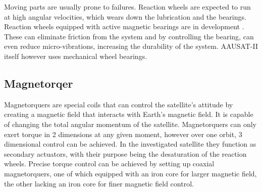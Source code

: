 Moving parts are usually prone to failures. Reaction wheels are expected to run at high angular velocities, which wears down the lubrication and the bearings. Reaction wheels equipped with active magnetic bearings are in development \cite{MagneticReactWheel}. These can eliminate friction from the system and by controlling the bearing, can even reduce micro-vibrations, increasing the durability of the system. AAUSAT-II itself however uses mechanical wheel bearings.



\subsection{Magnetorqer}

Magnetorquers are special coils that can control the satellite's attitude by creating a magnetic field that interacts with Earth's magnetic field. It is capable of changing the total angular momentum of the satellite. Magnetorquers can only exert torque in 2 dimensions at any given moment, however over one orbit, 3 dimensional control can be achieved. In the investigated satellite they function as secondary actuators, with their purpose being the desaturation of the reaction wheels. Precise torque control can be achieved by setting up coaxial magnetorquers, one of which equipped with an iron core for larger magnetic field, the other lacking an iron core for finer magnetic field control.